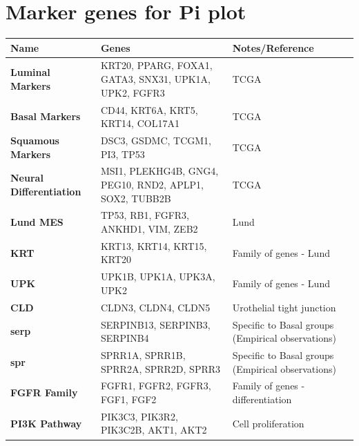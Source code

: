 \section{Marker genes for Pi plot} \label{s:ap:pi_genes} 


\begin{table}[H]
    \centering
    \scriptsize
    \begin{tabularx}{\textwidth}{>{\hsize=0.6\hsize}X|>{\hsize=1.4\hsize}X|>{\hsize=1\hsize}X}
        \toprule
        \textbf{Name} & \textbf{Genes} & \textbf{Notes/Reference} \\
        \midrule
        \textbf{Luminal Markers} & KRT20, PPARG, FOXA1, GATA3, SNX31, UPK1A, UPK2, FGFR3 & TCGA \cite{Robertson2017-mg} \\
        \midrule
        \textbf{Basal Markers} & CD44, KRT6A, KRT5, KRT14, COL17A1 & TCGA \cite{Robertson2017-mg} \\
        \midrule
        \textbf{Squamous Markers} & DSC3, GSDMC, TCGM1, PI3, TP53 & TCGA \cite{Robertson2017-mg} \\
        \midrule
        \textbf{Neural Differentiation} & MSI1, PLEKHG4B, GNG4, PEG10, RND2, APLP1, SOX2, TUBB2B & TCGA \cite{Robertson2017-mg} \\
        \midrule
        \textbf{Lund MES} & TP53, RB1, FGFR3, ANKHD1, VIM, ZEB2 & Lund \cite{Marzouka2018-ge} \\
        \midrule
        \textbf{KRT} & KRT13, KRT14, KRT15, KRT20 & Family of genes - Lund \cite{Marzouka2018-ge}\\
        \midrule
        \textbf{UPK} & UPK1B, UPK1A, UPK3A, UPK2 & Family of genes - Lund \cite{Marzouka2018-ge}\\
        \midrule
        \textbf{CLD} & CLDN3, CLDN4, CLDN5 & Urothelial tight junction \cite{Smith2015-rj}  \\
        \midrule
        \textbf{serp} & SERPINB13, SERPINB3, SERPINB4 & Specific to Basal groups (Empirical observations) \\
        \midrule
        \textbf{spr} & SPRR1A, SPRR1B, SPRR2A, SPRR2D, SPRR3 & Specific to Basal groups (Empirical observations) \\
        \midrule
        \textbf{FGFR Family} & FGFR1, FGFR2, FGFR3, FGF1, FGF2 & Family of genes - differentiation \\
        \midrule
        \textbf{PI3K Pathway} & PIK3C3, PIK3R2, PIK3C2B, AKT1, AKT2 & Cell proliferation \citet{Sathe2018-cq} \\

\end{tabularx}
\end{table}
